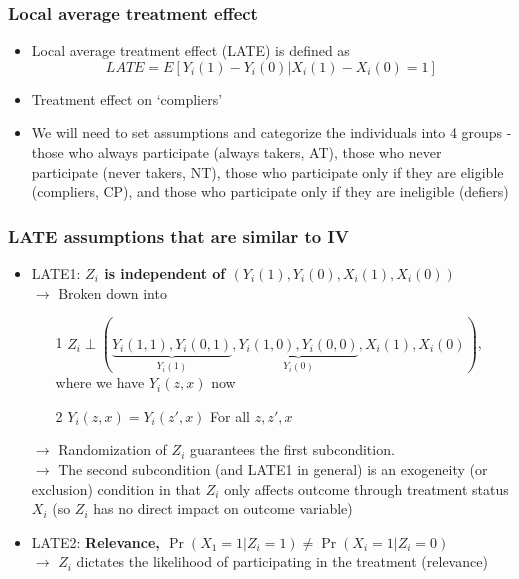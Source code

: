 \documentclass[aspectratio=169]{beamer}
\begin{document}
\begin{frame}
\frametitle{Local average treatment effect}
\begin{itemize}
\item Local average treatment effect (LATE) is defined as 
\[
LATE = E[Y_i(1)-Y_i(0)|X_i(1)-X_i(0)=1]
\]
\item Treatment effect on `compliers'
\item We will need to set assumptions and categorize the individuals into 4 groups - those who always participate (always takers, AT), those who never participate (never takers, NT), those who participate only if they are eligible (compliers, CP), and those who participate only if they are ineligible (defiers)
\end{itemize}
\end{frame}


\begin{frame}
\frametitle{LATE assumptions that are similar to IV}
\begin{itemize}
\item LATE1: \textbf{$Z_i$ is independent of $(Y_i(1), Y_i(0), X_i(1),X_i(0))$} \\
$\to$ Broken down into 
\begin{itemize}
\item[1] $Z_i\perp(\underbrace{Y_i(1,1),  Y_i(0,1)}_{Y_i(1)},\underbrace{Y_i(1,0), Y_i(0,0)}_{Y_i(0)}, X_i(1),X_i(0))$, where we have $Y_i(z,x)$ now
\item[2] $Y_i(z,x)=Y_i(z',x)$ For all $z,z',x$
\end{itemize}
$\to$ Randomization of $Z_i$ guarantees the first subcondition.  \\
$\to$ The second subcondition (and LATE1 in general) is an exogeneity (or exclusion) condition in that $Z_i$ only affects outcome through treatment status $X_i$ (so $Z_i$ has no direct impact on outcome variable)
\item LATE2: \textbf{Relevance, $\Pr(X_1=1|Z_i=1) \neq \Pr(X_i=1|Z_i=0)$}\\
$\to$ $Z_i$ dictates the likelihood of participating in the treatment (relevance)
\end{itemize}
\end{frame}
\end{document}
